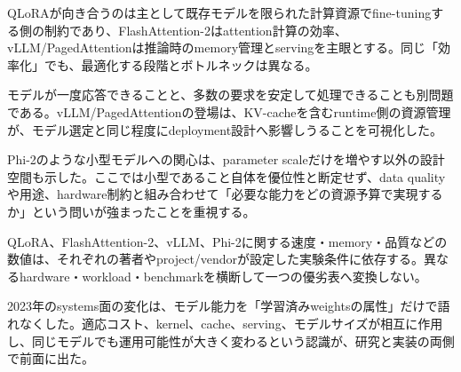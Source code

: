 
QLoRAが向き合うのは主として既存モデルを限られた計算資源でfine-tuningする側の制約であり、FlashAttention-2はattention計算の効率、vLLM/PagedAttentionは推論時のmemory管理とservingを主眼とする。同じ「効率化」でも、最適化する段階とボトルネックは異なる。\autocite{src-1ab9d44a819a,src-5e1a3a4fc45b,src-7f830e688335,src-e03b0ba5b24e,src-fb804ac849e4}


モデルが一度応答できることと、多数の要求を安定して処理できることも別問題である。vLLM/PagedAttentionの登場は、KV-cacheを含むruntime側の資源管理が、モデル選定と同じ程度にdeployment設計へ影響しうることを可視化した。\autocite{src-1ab9d44a819a,src-e03b0ba5b24e,src-fb804ac849e4}


Phi-2のような小型モデルへの関心は、parameter scaleだけを増やす以外の設計空間も示した。ここでは小型であること自体を優位性と断定せず、data qualityや用途、hardware制約と組み合わせて「必要な能力をどの資源予算で実現するか」という問いが強まったことを重視する。\autocite{src-6e61359d2fae}


\begin{claimboundary}
QLoRA、FlashAttention-2、vLLM、Phi-2に関する速度・memory・品質などの数値は、それぞれの著者やproject/vendorが設定した実験条件に依存する。異なるhardware・workload・benchmarkを横断して一つの優劣表へ変換しない。\autocite{src-1ab9d44a819a,src-5e1a3a4fc45b,src-6e61359d2fae,src-7f830e688335,src-e03b0ba5b24e,src-fb804ac849e4}
\end{claimboundary}

2023年のsystems面の変化は、モデル能力を「学習済みweightsの属性」だけで語れなくした。適応コスト、kernel、cache、serving、モデルサイズが相互に作用し、同じモデルでも運用可能性が大きく変わるという認識が、研究と実装の両側で前面に出た。\autocite{src-1ab9d44a819a,src-5e1a3a4fc45b,src-6e61359d2fae,src-7f830e688335,src-e03b0ba5b24e,src-fb804ac849e4}
